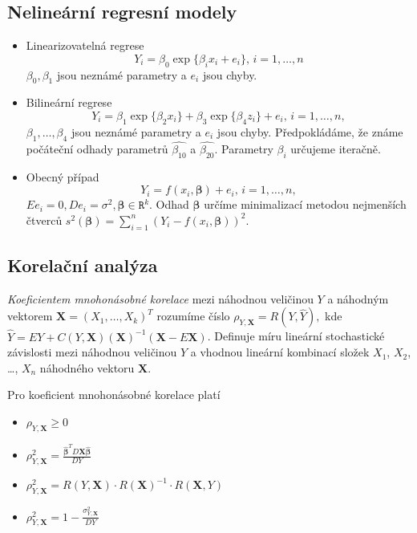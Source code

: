 \subsection{Nelineární regresní modely}
\begin{itemize}
\item Linearizovatelná regrese $$Y_i = \beta_0 \exp \{\beta_i x_i + e_i \},\, i=1,\ldots, n$$ $\beta_0, \beta_1$ jsou neznámé parametry a $e_i$ jsou chyby.
\item Bilineární regrese $$Y_i = \beta_1 \exp \{\beta_2 x_i \} + \beta_3 \exp \{\beta_4 z_i \}+ e_i,\,i=1,\ldots, n,$$ $\beta_1, \ldots, \beta_4$ jsou neznámé parametry a $e_i$ jsou chyby. Předpokládáme, že známe počáteční odhady parametrů $\hat{\beta_{10}}$ a $\hat{\beta_{20}}$. Parametry $\beta_i$ určujeme iteračně.
\item Obecný případ $$Y_i = f\left(x_i,\pmb{\beta} \right) + e_i,\,i=1,\ldots, n, $$ $E e_i = 0, D e_i = \sigma^2, \pmb{\beta} \in \mathtt{R}^k.$ Odhad $\pmb{\beta}$ určíme minimalizací metodou nejmenších čtverců $ s^2 \left(\pmb{\beta} \right) = \sum_{i=1}^{n} \left( Y_i - f \left(x_i,\pmb{\beta} \right) \right)^2.$
\end{itemize}

\subsection{Korelační analýza}
\begin{definition}
\textit{Koeficientem mnohonásobné korelace} mezi náhodnou veličinou $Y$ a náhodným vektorem $\pmb{X} = \left(X_1,\ldots, X_k \right)^T$ rozumíme číslo $\rho_{Y,\pmb{X}} = R \left( Y, \hat{Y} \right),$ kde $\hat{Y} = E Y + C \left(Y, \pmb{X} \right) \left(\pmb{X}\right)^{-1}\left(\pmb{X}- E \pmb{X} \right)$. Definuje míru lineární stochastické závislosti mezi náhodnou veličinou $Y$ a vhodnou lineární kombinací složek $X_1$, $X_2$, \ldots, $X_n$ náhodného vektoru $\mathbf{X}$.
\end{definition}

\begin{theorem}
Pro koeficient mnohonásobné korelace platí
\begin{itemize}
\item $\rho_{Y, \mathbf{X}} \geq 0$
\item $\rho_{Y, \mathbf{X}}^2 = \frac{\bm{\hat{\beta}}^T D \mathbf{X} \bm{\hat{\beta}}}{D Y}$
\item $\rho_{Y, \mathbf{X}}^2 = R(Y, \mathbf{X}) \cdot R(\mathbf{X})^{-1} \cdot R(\mathbf{X}, Y)$
\item $\rho_{Y, \mathbf{X}}^2 = 1 - \frac{\sigma_{Y, \mathbf{X}}^2}{D Y}$
\end{itemize}
\end{theorem}

